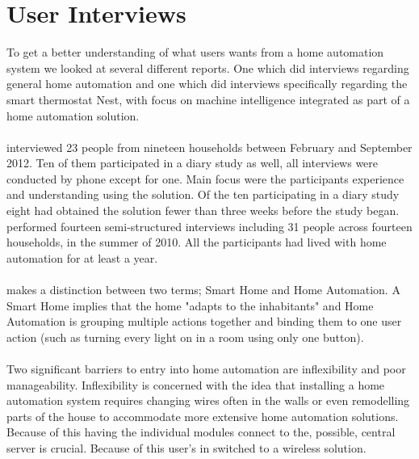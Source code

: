 \section{User Interviews}
\label{sec:interviewReports}
To get a better understanding of what users wants from a home automation system we looked at several different reports. One \cite{HAInterviews} which did interviews regarding general home automation and one which did interviews specifically regarding the smart thermostat Nest\cite{AdaptiveInterviews}, with focus on machine intelligence integrated as part of a home automation solution. 
\\\\
\cite{AdaptiveInterviews} interviewed 23 people from nineteen households between February  and September 2012. Ten of them participated in a diary study as well, all interviews were conducted by phone except for one. Main focus were the participants experience and understanding using the solution. Of the ten participating in a diary study eight had obtained the solution fewer than three weeks before the study began. 
\cite{HAInterviews} performed fourteen semi-structured interviews including 31 people across fourteen households, in the summer of 2010. All the participants had lived with home automation for at least a year.
\\\\
\cite{HAInterviews} makes a distinction between two terms; Smart Home and Home Automation. A Smart Home implies that the home "adapts to the inhabitants" and Home Automation is grouping multiple actions together and binding them to one user action (such as turning every light on in a room using only one button).
\\\\
Two significant barriers to entry into home automation are inflexibility and poor manageability\cite{HAInterviews}. Inflexibility is concerned with the idea that installing a home automation system requires changing wires often in the walls or even remodelling parts of the house to accommodate more extensive home automation solutions. Because of this having the individual modules connect to the, possible, central server is crucial. Because of this user's in \cite{HAInterviews} switched to a wireless solution.

